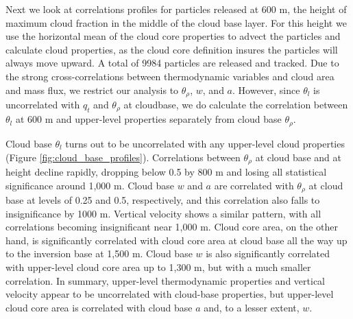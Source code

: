 \documentclass[acp]{copernicus}
\begin{document}
Next we look at correlations profiles for particles released at 600 m, the 
height of maximum cloud fraction in the middle of the cloud base layer.
For this height we use the horizontal mean of the cloud core properties to 
advect the particles and calculate cloud properties, as the cloud core 
definition insures the particles will always move upward.  A total of 
9984 particles are released and tracked.  Due to the strong cross-correlations 
between thermodynamic variables and cloud area and mass flux, we restrict our 
analysis to $\theta_\rho$, $w$, and $a$.  However, since $\theta_l$ is 
uncorrelated with $q_t$ and $\theta_\rho$ at cloudbase, we do calculate the 
correlation between $\theta_l$ at 600 m and upper-level properties separately 
from cloud base $\theta_\rho$.

Cloud base $\theta_l$ turns out to be uncorrelated with any upper-level 
cloud properties (Figure \ref{fig:cloud_base_profiles}).  Correlations between 
$\theta_\rho$ at cloud base and at height decline rapidly, dropping below 
0.5 by 800 m and losing all statistical significance around 1,000 m.  Cloud 
base $w$ and $a$ are correlated with $\theta_\rho$ at cloud base at levels of 
0.25 and 0.5, respectively, and this correlation also falls to insignificance 
by 1000 m.  Vertical velocity shows a similar pattern, with all correlations 
becoming insignificant near 1,000 m.  Cloud core area, on the other hand, 
is significantly correlated with cloud core area at cloud base all the way up 
to the inversion base at 1,500 m.  Cloud base $w$ is also significantly 
correlated with upper-level cloud core area up to 1,300 m, but with a much 
smaller correlation.  In summary, upper-level thermodynamic properties and 
vertical velocity appear to be uncorrelated with cloud-base properties, but 
upper-level cloud core area is correlated with cloud base $a$ and, to a lesser
extent, $w$.
\end{document}
